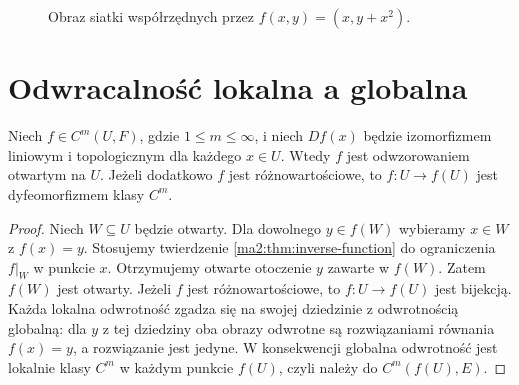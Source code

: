 \begin{figure}[htbp]
\centering
{}
\caption{Obraz siatki współrzędnych przez $f(x,y)=(x,y+x^2)$.}
\label{ma2:fig:inverse-shear}
\end{figure}

\section{Odwracalność lokalna a globalna}

\begin{wniosek}
\label{ma2:cor:inverse-global-injective}
Niech $f\in C^m(U,F)$, gdzie $1\le m\le\infty$,
i niech $Df(x)$ będzie izomorfizmem liniowym
i topologicznym dla każdego $x\in U$.
Wtedy $f$ jest odwzorowaniem otwartym na $U$.
Jeżeli dodatkowo $f$ jest różnowartościowe, to
$f:U\to f(U)$ jest dyfeomorfizmem klasy $C^m$.
\end{wniosek}
\begin{proof}
Niech $W\subseteq U$ będzie otwarty. Dla dowolnego
$y\in f(W)$ wybieramy $x\in W$ z $f(x)=y$.
Stosujemy twierdzenie \ref{ma2:thm:inverse-function}
do ograniczenia $f|_W$ w punkcie $x$.
Otrzymujemy otwarte otoczenie $y$ zawarte w $f(W)$.
Zatem $f(W)$ jest otwarty.
Jeżeli $f$ jest różnowartościowe, to $f:U\to f(U)$
jest bijekcją. Każda lokalna odwrotność zgadza się
na swojej dziedzinie z odwrotnością globalną:
dla $y$ z tej dziedziny oba obrazy odwrotne są
rozwiązaniami równania $f(x)=y$, a rozwiązanie
jest jedyne. W konsekwencji globalna odwrotność
jest lokalnie klasy $C^m$ w każdym punkcie $f(U)$,
czyli należy do $C^m(f(U),E)$.
\end{proof}

